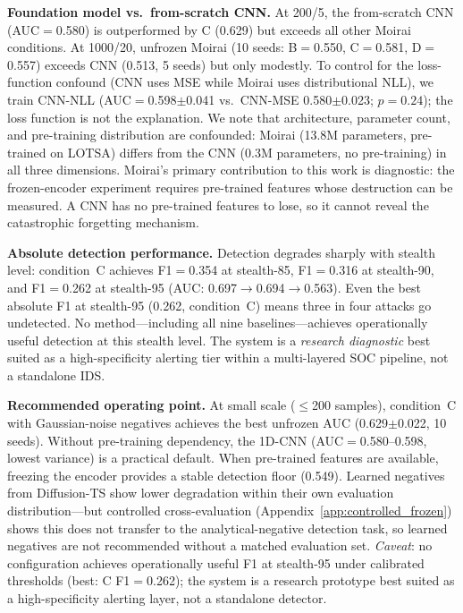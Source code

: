 \textbf{Foundation model vs.\ from-scratch CNN.}
At 200/5, the from-scratch CNN (AUC$=$0.580) is outperformed by C (0.629)
but exceeds all other Moirai conditions.
At 1000/20, unfrozen Moirai (10 seeds: B$=$0.550, C$=$0.581, D$=$0.557)
exceeds CNN (0.513, 5 seeds) but only modestly.
To control for the loss-function confound (CNN uses MSE while Moirai uses
distributional NLL), we train CNN-NLL (AUC$=$0.598$\pm$0.041 vs.\ CNN-MSE
0.580$\pm$0.023; $p{=}0.24$); the loss function is not the explanation.
We note that architecture, parameter count, and pre-training distribution
are confounded: Moirai (13.8M parameters, pre-trained on LOTSA) differs
from the CNN (0.3M parameters, no pre-training) in all three dimensions.
Moirai's primary contribution to this work is diagnostic: the frozen-encoder
experiment requires pre-trained features whose destruction can be measured.
A CNN has no pre-trained features to lose, so it cannot reveal the
catastrophic forgetting mechanism.

\textbf{Absolute detection performance.}
Detection degrades sharply with stealth level:
condition~C achieves F1$=$0.354 at stealth-85, F1$=$0.316 at stealth-90,
and F1$=$0.262 at stealth-95 (AUC: 0.697$\to$0.694$\to$0.563).
Even the best absolute F1 at stealth-95 (0.262, condition~C) means three
in four attacks go undetected.
No method---including all nine baselines---achieves operationally useful
detection at this stealth level.
The system is a \emph{research diagnostic} best suited as a
high-specificity alerting tier within a multi-layered SOC pipeline,
not a standalone IDS.

\textbf{Recommended operating point.}
At small scale ($\leq$200 samples), condition~C with Gaussian-noise
negatives achieves the best unfrozen AUC (0.629$\pm$0.022, 10 seeds).
Without pre-training dependency, the 1D-CNN (AUC$=$0.580--0.598, lowest
variance) is a practical default.
When pre-trained features are available, freezing the encoder provides a
stable detection floor (0.549).
Learned negatives from Diffusion-TS show lower degradation within their
own evaluation distribution---but controlled cross-evaluation
(Appendix~\ref{app:controlled_frozen}) shows this does not transfer to the
analytical-negative detection task, so learned negatives are not recommended
without a matched evaluation set.
\emph{Caveat}: no configuration achieves operationally useful F1 at
stealth-95 under calibrated thresholds (best: C F1$=$0.262); the system
is a research prototype best suited as a high-specificity alerting layer,
not a standalone detector.

